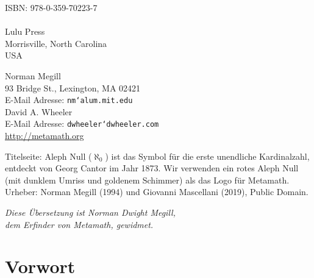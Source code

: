 \begin{center}
\vspace{7ex}
ISBN: 978-0-359-70223-7 \\
{\ } \\
Lulu Press \\
Morrisville, North Carolina\\
USA


\hfill
\vfill

Norman Megill\\ 93 Bridge St., Lexington, MA 02421 \\
E-Mail Adresse: \texttt{nm{\char`\@}alum.mit.edu} \\
\vspace{7ex}
David A. Wheeler \\
E-Mail Adresse: \texttt{dwheeler{\char`\@}dwheeler.com} \\
\vspace{7ex}
\url{http://metamath.org}
\end{center}

\hfill
\vfill

{\parindent0pt%
\footnotesize{%
Titelseite: Aleph Null ($\aleph_0$) ist das Symbol für die erste unendliche Kardinalzahl, entdeckt von Georg Cantor im Jahr 1873. Wir verwenden ein rotes Aleph Null (mit dunklem Umriss und goldenem Schimmer) als das Logo für Metamath.
Urheber: Norman Megill (1994) und Giovanni Mascellani (2019),
Public Domain.%
%
}}

\newpage
\thispagestyle{empty}

\hfill
\vfill

\begin{center}
{\it Diese Übersetzung ist Norman Dwight Megill,\\
	 dem Erfinder von Metamath, gewidmet.}
\end{center}

\vfill
\hfill

\newpage

\tableofcontents

\chapter*{Vorwort}


